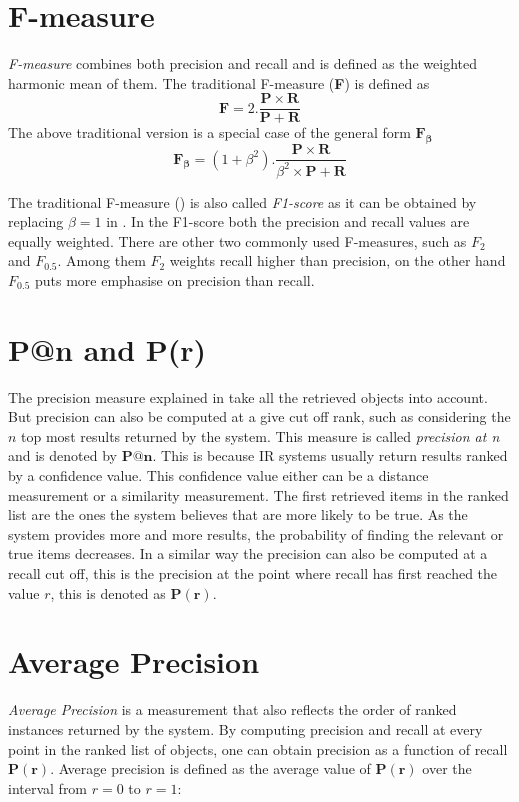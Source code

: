 \section{F-measure}
\label{sec:perf-eval:fmeasure}
\emph{F-measure} combines both precision and recall and is defined as the weighted harmonic mean of them. The traditional F-measure (\textbf{F}) is defined as 
\begin{equation}
\mathbf{F} = 2.\frac{\mathbf{P}\times \mathbf{R}}{\mathbf{P}+\mathbf{R}}
\label{eqn:perf-eval:fm1}
\end{equation}
The above traditional version is a special case of the general form $\mathbf{F_\beta}$
\begin{equation}
\mathbf{F_\beta}=(1+\beta^2).\frac{\mathbf{P}\times \mathbf{R}}{\beta^2\times \mathbf{P}+\mathbf{R}}
\label{eqn:perf-eval:fmb}
\end{equation}

The traditional F-measure () is also called \emph{F1-score} as it can be obtained by replacing $\beta=1$ in . In the F1-score both the precision and recall values are equally weighted. There are other two commonly used F-measures, such as $F_{2}$ and $F_{0.5}$. Among them $F_{2}$ weights recall higher than precision, on the other hand $F_{0.5}$ puts more emphasise on precision than recall.

\section{P@n and P(r)}
\label{sec:perf-eval:prec-nr}
The precision measure explained in  take all the retrieved objects into account. But precision can also be computed at a give cut off rank, such as considering the $n$ top most results returned by the system. This measure is called \emph{precision at n} and is denoted by $\mathbf{P@n}$. This is because IR systems usually return results ranked by a confidence value. This confidence value either can be a distance measurement or a similarity measurement. The first retrieved items in the ranked list are the ones the system believes that are more likely to be true. As the system provides more and more results, the probability of finding the relevant or true items decreases. In a similar way the precision can also be computed at a recall cut off, this is the precision at the point where recall has first reached the value $r$, this is denoted as $\mathbf{P(r)}$.

\section{Average Precision}
\label{sec:perf-eval:avep}
\emph{Average Precision} is a measurement that also reflects the order of ranked instances returned by the system. By computing precision and recall at every point in the ranked list of objects, one can obtain precision as a function of recall \ie $\mathbf{P(r)}$. Average precision is defined as the average value of $\mathbf{P(r)}$ over the interval from $r=0$ to $r=1$:

